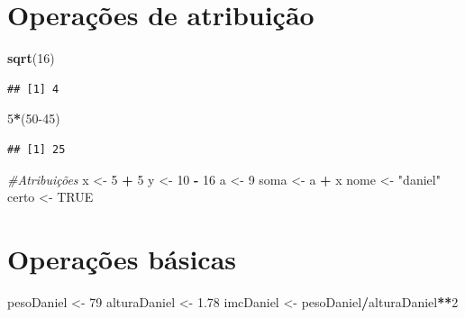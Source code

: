 \documentclass[
]{article}
\newenvironment{Shaded}{\begin{snugshade}}{\end{snugshade}}
\newcommand{\CommentTok}[1]{\textcolor[rgb]{0.56,0.35,0.01}{\textit{#1}}}
\newcommand{\DecValTok}[1]{\textcolor[rgb]{0.00,0.00,0.81}{#1}}
\newcommand{\FloatTok}[1]{\textcolor[rgb]{0.00,0.00,0.81}{#1}}
\newcommand{\KeywordTok}[1]{\textcolor[rgb]{0.13,0.29,0.53}{\textbf{#1}}}
\newcommand{\NormalTok}[1]{#1}
\newcommand{\OperatorTok}[1]{\textcolor[rgb]{0.81,0.36,0.00}{\textbf{#1}}}
\newcommand{\OtherTok}[1]{\textcolor[rgb]{0.56,0.35,0.01}{#1}}
\newcommand{\StringTok}[1]{\textcolor[rgb]{0.31,0.60,0.02}{#1}}
\begin{document}
\hypertarget{operauxe7uxf5es-de-atribuiuxe7uxe3o}{%
\section{Operações de
atribuição}\label{operauxe7uxf5es-de-atribuiuxe7uxe3o}}

\begin{Shaded}
\begin{Highlighting}[]
\KeywordTok{sqrt}\NormalTok{(}\DecValTok{16}\NormalTok{)}
\end{Highlighting}
\end{Shaded}

\begin{verbatim}
## [1] 4
\end{verbatim}

\begin{Shaded}
\begin{Highlighting}[]
\DecValTok{5}\OperatorTok{*}\NormalTok{(}\DecValTok{50-45}\NormalTok{)}
\end{Highlighting}
\end{Shaded}

\begin{verbatim}
## [1] 25
\end{verbatim}

\begin{Shaded}
\begin{Highlighting}[]
\CommentTok{#Atribuições}
\NormalTok{x <-}\StringTok{ }\DecValTok{5} \OperatorTok{+}\StringTok{ }\DecValTok{5}
\NormalTok{y <-}\StringTok{ }\DecValTok{10} \OperatorTok{-}\StringTok{ }\DecValTok{16}
\NormalTok{a <-}\StringTok{ }\DecValTok{9}
\NormalTok{soma <-}\StringTok{ }\NormalTok{a }\OperatorTok{+}\StringTok{ }\NormalTok{x}
\NormalTok{nome <-}\StringTok{ "daniel"}
\NormalTok{certo <-}\StringTok{ }\OtherTok{TRUE}
\end{Highlighting}
\end{Shaded}

\hypertarget{operauxe7uxf5es-buxe1sicas}{%
\section{Operações básicas}\label{operauxe7uxf5es-buxe1sicas}}

\begin{Shaded}
\begin{Highlighting}[]
\NormalTok{pesoDaniel <-}\StringTok{ }\DecValTok{79}
\NormalTok{alturaDaniel <-}\StringTok{ }\FloatTok{1.78}
\NormalTok{imcDaniel <-}\StringTok{ }\NormalTok{pesoDaniel}\OperatorTok{/}\NormalTok{alturaDaniel}\OperatorTok{**}\DecValTok{2}
\end{Highlighting}
\end{Shaded}
\end{document}
